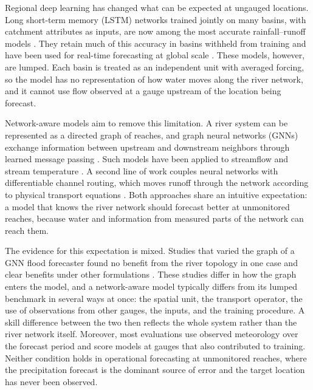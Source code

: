 \documentclass[draft]{agujournal2019}
\begin{document}
Regional deep learning has changed what can be expected at ungauged locations. Long short-term memory (LSTM) networks trained jointly on many basins, with catchment attributes as inputs, are now among the most accurate rainfall--runoff models \cite{Kratzert2018,Kratzert2019hess}. They retain much of this accuracy in basins withheld from training \cite{Kratzert2019wrr,Arsenault2023} and have been used for real-time forecasting at global scale \cite{Nearing2024}. These models, however, are lumped. Each basin is treated as an independent unit with averaged forcing, so the model has no representation of how water moves along the river network, and it cannot use flow observed at a gauge upstream of the location being forecast.

Network-aware models aim to remove this limitation. A river system can be represented as a directed graph of reaches, and graph neural networks (GNNs) exchange information between upstream and downstream neighbors through learned message passing \cite{Gilmer2017,Kipf2017}. Such models have been applied to streamflow and stream temperature \cite{Moshe2020,Jia2021,Sun2022}. A second line of work couples neural networks with differentiable channel routing, which moves runoff through the network according to physical transport equations \cite{Bindas2024,Song2025}. Both approaches share an intuitive expectation: a model that knows the river network should forecast better at unmonitored reaches, because water and information from measured parts of the network can reach them.

The evidence for this expectation is mixed. Studies that varied the graph of a GNN flood forecaster found no benefit from the river topology in one case \cite{Kirschstein2024} and clear benefits under other formulations \cite{WangH2025,Mosaffa2026}. These studies differ in how the graph enters the model, and a network-aware model typically differs from its lumped benchmark in several ways at once: the spatial unit, the transport operator, the use of observations from other gauges, the inputs, and the training procedure. A skill difference between the two then reflects the whole system rather than the river network itself. Moreover, most evaluations use observed meteorology over the forecast period and score models at gauges that also contributed to training. Neither condition holds in operational forecasting at unmonitored reaches, where the precipitation forecast is the dominant source of error \cite{Cloke2009} and the target location has never been observed.
\end{document}
